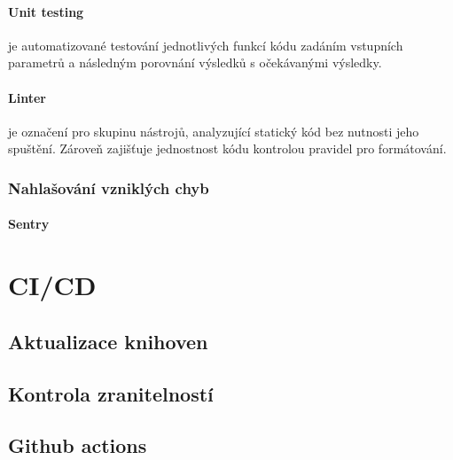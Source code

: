 \documentclass[12pt, a4paper,
 twoside,        %
 openright
]{report}
\begin{document}
\paragraph{Unit testing} je automatizované testování jednotlivých funkcí kódu zadáním vstupních parametrů a následným porovnání výsledků s očekávanými výsledky.
\paragraph{Linter} je označení pro skupinu nástrojů, analyzující statický kód bez nutnosti jeho spuštění. Zároveň zajišťuje jednostnost kódu kontrolou pravidel pro formátování. 
\subsubsection{Nahlašování vzniklých chyb}
\paragraph{Sentry}


 

\section{CI/CD}
\subsection{Aktualizace knihoven}
\subsection{Kontrola zranitelností}
\subsection{Github actions} 




 
\end{document}
